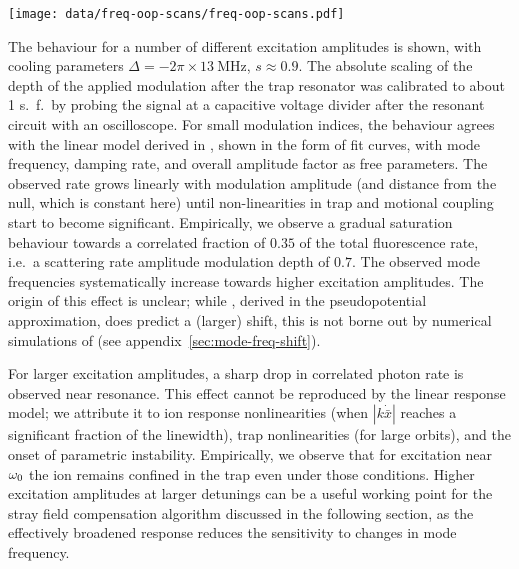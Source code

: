 \documentclass[pra,twocolumn]{revtex4-2}
\begin{document}
\begin{figure*}
	\texttt{[image: data/freq-oop-scans/freq-oop-scans.pdf]}
	\caption{Complex fractional amplitude of correlated photon arrival times, as a function of excitation frequency and applied field normal to the trap surface, for radial in-plane compensation fields of $E_{\mathrm{IP}} = \SI{-126}{\volt / \metre}$, \SI{-108}{\volt / \metre}, and \SI{-89}{\volt / \metre}, respectively. Colour shows phase, and brightness shows amplitude (extracted from \num{10000} photons observed per point). The dashed circles highlight the points where the projection of micromotion onto the respective radial mode vanishes. Only when $E_{\mathrm{IP}}$ is chosen such that the stray field in the in-plane direction is minimised (centre plot) can both modes be compensated. The dependence of radial mode frequencies on ion position due to trap anharmonicity is visible as a slant to the resonance lines.}
	\label{fig:freq-oop-scans}
\end{figure*}

The behaviour for a number of different excitation amplitudes is shown, with cooling parameters $\Delta = -2\pi \times \SI{13}{\mega\hertz}$, $s \approx 0.9$.
The absolute scaling of the depth of the applied modulation after the trap resonator was calibrated to about 1 s.~f.~by probing the signal at a capacitive voltage divider after the resonant circuit with an oscilloscope.
For small modulation indices, the behaviour agrees with the linear model derived in , shown in the form of fit curves, with mode frequency, damping rate, and overall amplitude factor as free parameters.
The observed rate grows linearly with modulation amplitude (and distance from the \RF{} null, which is constant here) until non-linearities in trap and motional coupling start to become significant.
Empirically, we observe a gradual saturation behaviour towards a correlated fraction of $0.35$ of the total fluorescence rate, i.e.~a scattering rate amplitude modulation depth of $0.7$.
The observed mode frequencies systematically increase towards higher excitation amplitudes.
The origin of this effect is unclear; while , derived in the pseudopotential approximation, does predict a (larger) shift, this is not borne out by numerical simulations of  (see appendix~\ref{sec:mode-freq-shift}).

For larger excitation amplitudes, a sharp drop in correlated photon rate is observed near resonance.
This effect cannot be reproduced by the linear response model; we attribute it to ion response nonlinearities (when $|k \dot{\bar{x}}|$ reaches a significant fraction of the linewidth), trap nonlinearities (for large orbits), and the onset of parametric instability.
Empirically, we observe that for excitation near $\omega_{\textrm{0}}$ the ion remains confined in the trap even under those conditions.
Higher excitation amplitudes at larger detunings can be a useful working point for the stray field compensation algorithm discussed in the following section, as the effectively broadened response reduces the sensitivity to changes in mode frequency.
\end{document}
